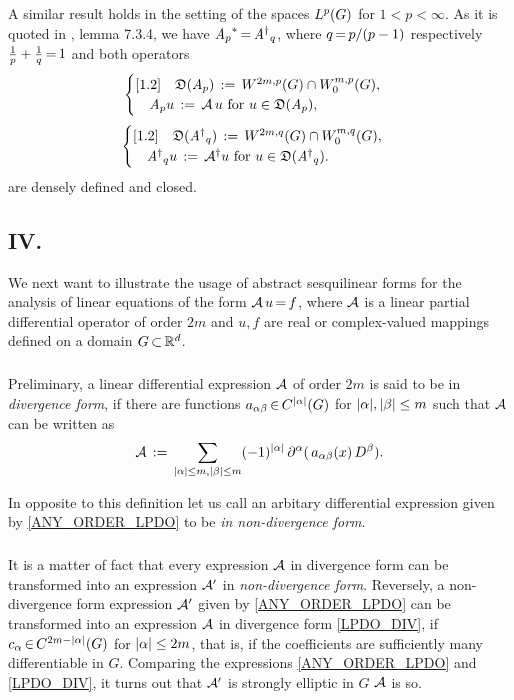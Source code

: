 \documentclass[11pt,twoside]{article}
\def\G{G}
\begin{document}
\subparagraph{} %
A similar result holds in the setting of the spaces $\Lp$ for $1 < p < \infty$.
As it is quoted in \cite{Pa}, lemma 7.3.4,
we have 
${\mathit{A}_p}^* {\,=\,} {{\mathit{A}}^{\dag}}_q$,
where $q {\,=\,} p/(p-1)$ respectively $\frac{1}{p} + \frac{1}{q} {\,=\,} 1$
and both operators
\[
\begin{cases}[1.2]
\quad \domain{\linA_p} \eqdef W^{2m,p}(\G) \cap \WN{m,p}{\G},\\
\quad \linA_p u \eqdef \A\,u \for u \in \domain{\linA_p},\\
\end{cases}
\]
\[
\begin{cases}[1.2]
\quad \domain{{\linA^{\dag}}_q} \eqdef W^{2m,q}(\G) \cap \WN{m,q}{\G},\\
\quad {\linA^{\dag}}_q u \eqdef \A^{\dag} u
      \for u \in \domain{{\linA^{\dag}}_q}.\\
\end{cases}
\]
are densely defined and closed.

\subsection*{IV. {\TITLED}}
We next want to illustrate the usage of abstract sesquilinear
forms for the analysis of linear equations of the form ${\mathcal{A}} \, u {\,=\,} f$,
where ${\mathcal{A}}$ is a linear partial differential operator of order $2m$
and $u,f$ are real or complex-valued mappings
defined on a domain $\G \xsubset \Rd$.

\subparagraph{} %
Preliminary,
a linear differential expression ${\mathcal{A}}$ of order $2m$
is said to be in \textit{divergence form},
if there are functions $a_{\alpha \beta} \xeof C^{\abs{\alpha} }(\G)$
for $\abs{\alpha} , \abs{\beta} \leq m$
such that ${\mathcal{A}}$ can be written as
\begin{equation}\label{LPDO_DIV}
\A \eqdef
\sum_{\abs{\alpha} \leq m, \abs{\beta} \leq m} (-1)^{\abs{\alpha} } \,
\PA(\,a_{\alpha \beta}(x) \, D^{\beta}).
\end{equation}

In opposite to this definition let us call an arbitary differential expression
given by \eqref{ANY_ORDER_LPDO} to be \textit{in non-divergence form}.

\subparagraph{} %
It is a matter of fact
that every expression ${\mathcal{A}}$ in divergence form
can be transformed into an expression ${\mathcal{A}}'$ in \textit{non-divergence form}.
Reversely,
a non-divergence form expression ${\mathcal{A}}'$ given by \eqref{ANY_ORDER_LPDO}
can be transformed into an expression ${\mathcal{A}}$ in divergence form \eqref{LPDO_DIV},
if $c_{\alpha} \xeof C^{2m - \abs{\alpha} }(\G)$ for $\abs{\alpha} \leq 2m$,
that is,
if the coefficients are sufficiently many differentiable in $\G$.
Comparing the expressions \eqref{ANY_ORDER_LPDO} and \eqref{LPDO_DIV},
it turns out that
${\mathcal{A}}'$ is strongly elliptic in $\G$ \iff ${\mathcal{A}}$ is so.
\end{document}
